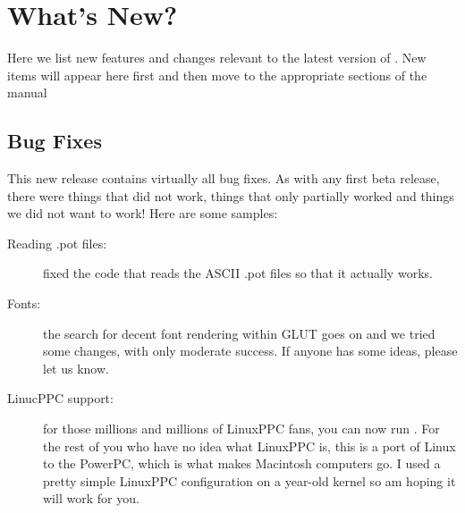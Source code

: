 %
%
\section{What's New?}

Here we list new features and changes relevant to the latest version of
\map{}.  New items will appear here first and then move to the appropriate
sections of the manual

\subsection{Bug Fixes}

This new release contains virtually all bug fixes.  As with any first beta
release, there were things that did not work, things that only partially
worked and things we did not want to work!  Here are some samples:
%
\begin{description}
  \item [Reading .pot files: ] fixed the code that reads the ASCII .pot
        files so that it actually works.
  \item [Fonts: ] the search for decent font rendering within GLUT goes on
        and we tried some changes, with only moderate success.  If anyone
        has some ideas, please let us know.
  \item [LinucPPC support: ] for those millions and millions of LinuxPPC
        fans, you can now run \map{}.  For the rest of you who have no idea
        what LinuxPPC is, this is a port of Linux to the PowerPC, which is
        what makes Macintosh computers go.  I used a pretty simple LinuxPPC
        configuration on a year-old kernel so am hoping it will work for you.
\end{description}



